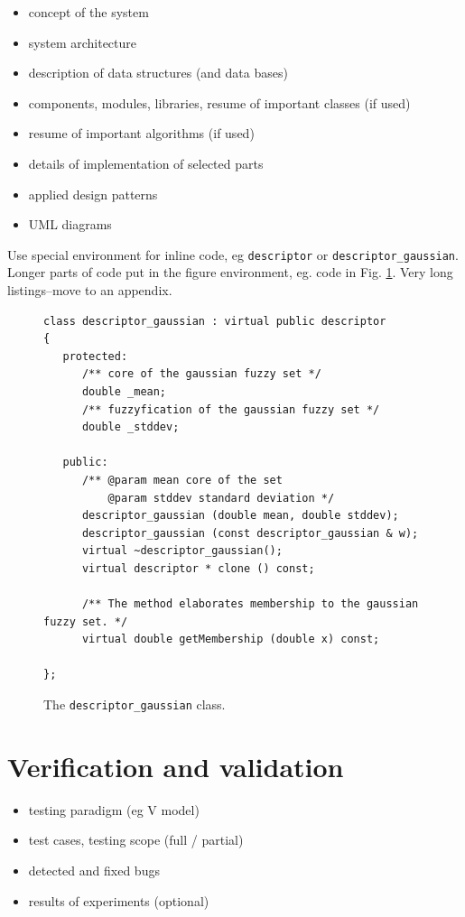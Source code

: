 \documentclass[a4paper,twoside,12pt]{book}
\begin{document}
\begin{itemize}
\item concept of the system
\item system architecture
\item description of data structures (and data bases)
\item components, modules, libraries, resume of important classes (if used)
\item resume of important algorithms (if used)
\item details of implementation of selected parts
\item applied design patterns
\item UML diagrams
\end{itemize}


Use special environment for inline code, eg \lstinline|descriptor| or \lstinline|descriptor_gaussian|. 
Longer parts of code put in the figure environment, eg. code in Fig. \ref{fig:pseudokod}. Very long listings–move to an appendix.

\begin{figure}
\centering
\begin{lstlisting}
class descriptor_gaussian : virtual public descriptor
{
   protected:
      /** core of the gaussian fuzzy set */
      double _mean;
      /** fuzzyfication of the gaussian fuzzy set */
      double _stddev;
      
   public:
      /** @param mean core of the set
          @param stddev standard deviation */
      descriptor_gaussian (double mean, double stddev);
      descriptor_gaussian (const descriptor_gaussian & w);
      virtual ~descriptor_gaussian();
      virtual descriptor * clone () const;
      
      /** The method elaborates membership to the gaussian fuzzy set. */
      virtual double getMembership (double x) const;
     
};
\end{lstlisting}
\caption{The \lstinline|descriptor_gaussian| class.}
\label{fig:pseudokod}
\end{figure}


\chapter{Verification and validation}
\begin{itemize}
\item testing paradigm (eg V model)
\item test cases, testing scope (full / partial)
\item detected and fixed bugs
\item results of experiments (optional)
\end{itemize}
\end{document}
